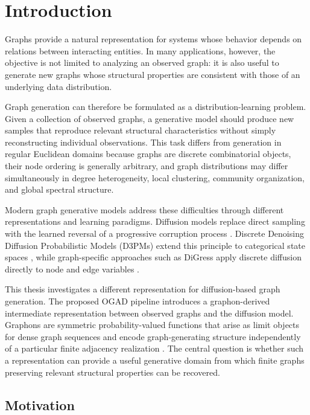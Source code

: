 \chapter{Introduction}
\label{chap:introduction}

Graphs provide a natural representation for systems whose behavior depends on relations between interacting entities. In many applications, however, the objective is not limited to analyzing an observed graph: it is also useful to generate new graphs whose structural properties are consistent with those of an underlying data distribution.

Graph generation can therefore be formulated as a distribution-learning problem. Given a collection of observed graphs, a generative model should produce new samples that reproduce relevant structural characteristics without simply reconstructing individual observations. This task differs from generation in regular Euclidean domains because graphs are discrete combinatorial objects, their node ordering is generally arbitrary, and graph distributions may differ simultaneously in degree heterogeneity, local clustering, community organization, and global spectral structure.

Modern graph generative models address these difficulties through different representations and learning paradigms. Diffusion models replace direct sampling with the learned reversal of a progressive corruption process \cite{ho2020denoising}. Discrete Denoising Diffusion Probabilistic Models (D3PMs) extend this principle to categorical state spaces \cite{austin2021structured}, while graph-specific approaches such as DiGress apply discrete diffusion directly to node and edge variables \cite{vignac2023digress}.

This thesis investigates a different representation for diffusion-based graph generation. The proposed OGAD pipeline introduces a graphon-derived intermediate representation between observed graphs and the diffusion model. Graphons are symmetric probability-valued functions that arise as limit objects for dense graph sequences and encode graph-generating structure independently of a particular finite adjacency realization \cite{lovasz2006limits}. The central question is whether such a representation can provide a useful generative domain from which finite graphs preserving relevant structural properties can be recovered.


\section{Motivation}
\label{sec:intro_motivation}

